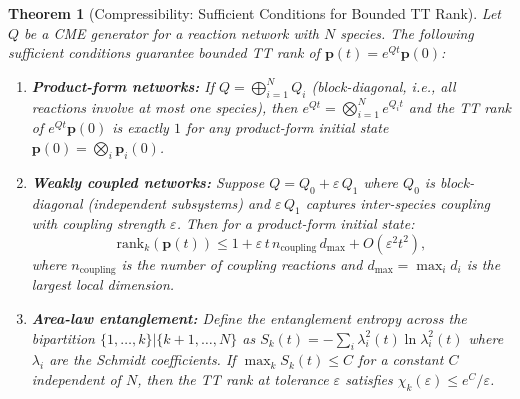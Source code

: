 \documentclass[11pt]{article}
\newtheorem{theorem}{Theorem}
\newcommand{\eps}{\varepsilon}
\begin{document}
\begin{theorem}[Compressibility: Sufficient Conditions for Bounded TT Rank]\label{thm:compressibility}
Let $Q$ be a CME generator for a reaction network with $N$ species.
The following sufficient conditions guarantee bounded TT rank of
$\mathbf{p}(t) = e^{Qt}\mathbf{p}(0)$:

\begin{enumerate}[label=(\alph*)]
\item \textbf{Product-form networks:}
  If $Q = \bigoplus_{i=1}^{N} Q_i$ (block-diagonal, i.e., all reactions involve
  at most one species), then $e^{Qt} = \bigotimes_{i=1}^N e^{Q_i t}$ and
  the TT rank of $e^{Qt}\mathbf{p}(0)$ is exactly $1$ for any
  product-form initial state $\mathbf{p}(0) = \bigotimes_i \mathbf{p}_i(0)$.

\item \textbf{Weakly coupled networks:}
  Suppose $Q = Q_0 + \eps\, Q_1$ where $Q_0$ is block-diagonal
  (independent subsystems) and $\eps\,Q_1$ captures inter-species
  coupling with coupling strength $\eps$.
  Then for a product-form initial state:
  \begin{equation}\label{eq:weak-coupling}
    \mathrm{rank}_k(\mathbf{p}(t))
    \leq 1 + \eps\,t\,n_{\mathrm{coupling}}\,d_{\max} + O(\eps^2 t^2),
  \end{equation}
  where $n_{\mathrm{coupling}}$ is the number of coupling reactions
  and $d_{\max} = \max_i d_i$ is the largest local dimension.

\item \textbf{Area-law entanglement:}
  Define the entanglement entropy across the bipartition
  $\{1,\ldots,k\} | \{k{+}1,\ldots,N\}$ as
  $S_k(t) = -\sum_i \lambda_i^2(t) \ln \lambda_i^2(t)$
  where $\lambda_i$ are the Schmidt coefficients.
  If $\max_k S_k(t) \leq C$ for a constant $C$ independent of $N$,
  then the TT rank at tolerance $\eps$ satisfies
  $\chi_k(\eps) \leq e^C / \eps$.
\end{enumerate}
\end{theorem}
\end{document}
